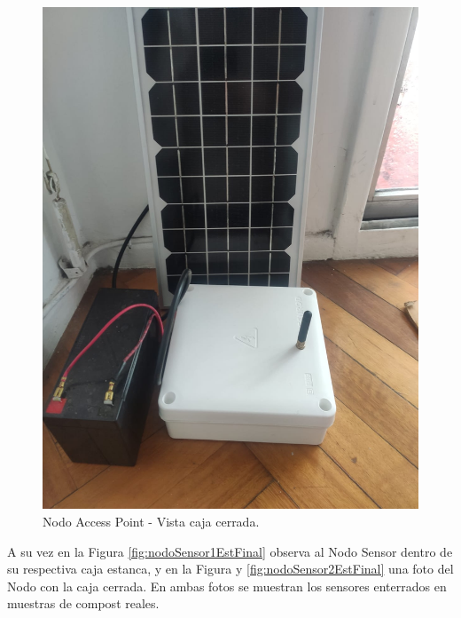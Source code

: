 \begin{figure}[H]
	\centering
	\includegraphics[scale=0.25]{Figures/Pruebas/nodoAP2.jpeg}
	\caption{Nodo Access Point - Vista caja cerrada.}
	\label{fig:nodoap2EstrFinal}
\end{figure}

A su vez en la Figura \ref{fig:nodoSensor1EstFinal} observa al Nodo Sensor dentro de su respectiva caja estanca, y en la Figura y \ref{fig:nodoSensor2EstFinal} una foto del Nodo con la caja cerrada. En ambas fotos se muestran los sensores enterrados en muestras de compost reales.

